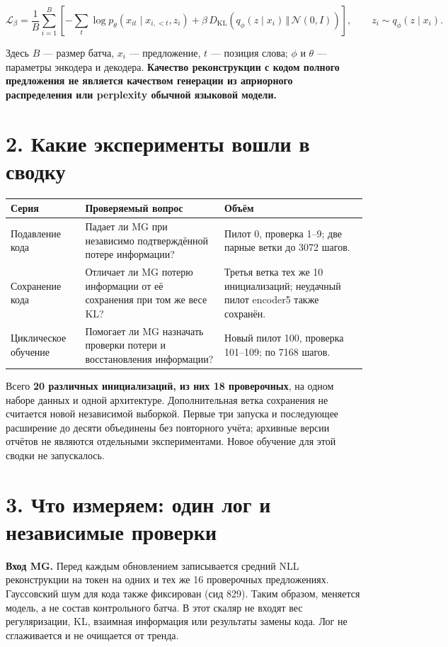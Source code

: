 \documentclass[10pt,a4paper]{article}
\begin{document}
\[
\mathcal L_\beta=\frac1B\sum_{i=1}^{B}\left[-\sum_t\log p_\theta(x_{it}\mid x_{i,<t},z_i)+\beta\,D_{\mathrm{KL}}\!\left(q_\phi(z\mid x_i)\,\Vert\,\mathcal N(0,I)\right)\right],\qquad z_i\sim q_\phi(z\mid x_i).
\]

Здесь $B$ --- размер батча, $x_i$ --- предложение, $t$ --- позиция слова; $\phi$ и $\theta$ --- параметры энкодера и декодера. \textbf{Качество реконструкции с кодом полного предложения не является качеством генерации из априорного распределения или perplexity обычной языковой модели.}

\section*{2. Какие эксперименты вошли в сводку}

\begin{center}\small
\begin{tabularx}{\linewidth}{l>{\raggedright\arraybackslash}X>{\raggedright\arraybackslash}X}
\toprule
Серия & Проверяемый вопрос & Объём \\
\midrule
Подавление кода & Падает ли MG при независимо подтверждённой потере информации? & Пилот 0, проверка 1--9; две парные ветки до 3072 шагов. \\
Сохранение кода & Отличает ли MG потерю информации от её сохранения при том же весе KL? & Третья ветка тех же 10 инициализаций; неудачный пилот encoder5 также сохранён. \\
Циклическое обучение & Помогает ли MG назначать проверки потери и восстановления информации? & Новый пилот 100, проверка 101--109; по 7168 шагов. \\
\bottomrule\end{tabularx}\end{center}

Всего \textbf{20 различных инициализаций, из них 18 проверочных}, на одном наборе данных и одной архитектуре. Дополнительная ветка сохранения не считается новой независимой выборкой. Первые три запуска и последующее расширение до десяти объединены без повторного учёта; архивные версии отчётов не являются отдельными экспериментами. Новое обучение для этой сводки не запускалось.

\newpage
\section*{3. Что измеряем: один лог и независимые проверки}

\textbf{Вход MG.} Перед каждым обновлением записывается средний NLL реконструкции на токен на одних и тех же 16 проверочных предложениях. Гауссовский шум для кода также фиксирован (сид 829). Таким образом, меняется модель, а не состав контрольного батча. В этот скаляр не входят вес регуляризации, KL, взаимная информация или результаты замены кода. Лог не сглаживается и не очищается от тренда.
\end{document}
